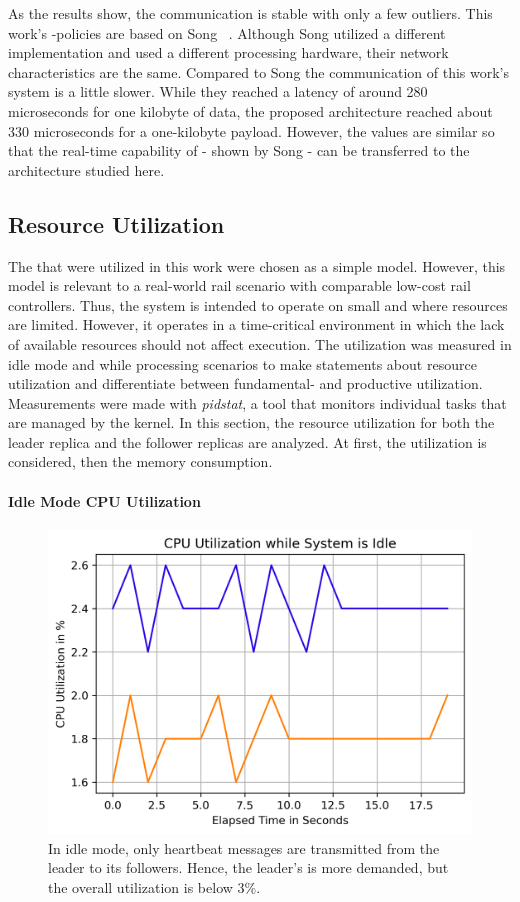 As the results show, the communication is stable with only a few outliers.
This work's -policies are based on Song \etal~\cite{SongDDSInRealTimeSystems}.
Although Song \etal utilized a different  implementation and used a different processing hardware, their network characteristics are the same.
Compared to Song \etal the communication of this work's system is a little slower.
While they reached a latency of around 280 microseconds for one kilobyte of data, the proposed architecture reached about 330 microseconds for a one-kilobyte payload.
However, the values are similar so that the real-time capability of  - shown by Song \etal - can be transferred to the architecture studied here.


\subsection{Resource Utilization}

The  that were utilized in this work were chosen as a simple model.
However, this model is relevant to a real-world rail scenario with comparable low-cost rail controllers.
Thus, the system is intended to operate on small and   where resources are limited.
However, it operates in a time-critical environment in which the lack of available resources should not affect execution.
The utilization was measured in idle mode and while processing scenarios to make statements about resource utilization and differentiate between fundamental- and productive utilization.
Measurements were made with \textit{pidstat}, a tool that monitors individual tasks that are managed by the  kernel.
In this section, the resource utilization for both the leader replica and the follower replicas are analyzed.
At first, the  utilization is considered, then the memory consumption.

\paragraph{Idle Mode CPU Utilization}

\begin{figure}[!hbt]
	\centering
	\includegraphics[width=0.8\linewidth]{images/plots/CPUUsageIdleTime}
	\caption{In idle mode, only heartbeat messages are transmitted from the leader to its followers. Hence, the leader's  is more demanded, but the overall utilization is below 3\%.}
	\label{fig:PlotCPUUsageIdleTime}
\end{figure}


